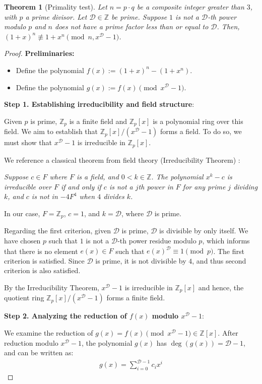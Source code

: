 \documentclass{article}
\theoremstyle{plain}
\theoremstyle{definition}
\newtheorem{theorem}{Theorem}
\newcommand{\D}{\mathcal{D}}
\begin{document}
\begin{theorem}[Primality test] \label{theorem:composites}
\textit{Let $n = p \cdot q$ be a composite integer greater than $3$, with $p$ a prime divisor. Let $\D \in \mathbb{Z}$ be prime. Suppose $1$ is not a $\D$-th power modulo $p$ and $n$ does not have a prime factor less than or equal to $\D$. Then, $(1 + x)^n \not\equiv 1 + x^n \pmod{n, x^{\D} - 1}$.}
\end{theorem}
\begin{proof}
\textbf{Preliminaries:}
\begin{itemize}
    \item Define the polynomial $f(x) := (1 + x)^n - (1 + x^n)$.
    \item Define the polynomial $g(x) := f(x) \pmod{x^{\D} - 1}$.
\end{itemize}

\textbf{Step 1. Establishing irreducibility and field structure}:

Given $p$ is prime, $\mathbb{Z}_p$ is a finite field and $\mathbb{Z}_p[x]$ is a polynomial ring over this field. We aim to establish that $\mathbb{Z}_p[x]/(x^{\D}-1)$ forms a field. To do so, we must show that $x^{\D}-1$ is irreducible in $\mathbb{Z}_p[x]$.

We reference a classical theorem from field theory (Irreducibility Theorem) \cite{karpilovsky1989fields}:

\textit{Suppose $c \in F$ where $F$ is a field, and $0 < k \in \mathbb{Z}$. The polynomial $x^k - c$ is irreducible over $F$ if and only if $c$ is not a $j$th power in $F$ for any prime $j$ dividing $k$, and $c$ is not in $-4F^4$ when $4$ divides $k$.}

In our case, $F = \mathbb{Z}_p$, $c = 1$, and $k = \D$, where $\D$ is prime.

Regarding the first criterion, given $\D$ is prime, $\D$ is divisible by only itself. We have chosen $p$ such that $1$ is not a $\D$-th power residue modulo $p$, which informs that there is no element $e(x) \in F$ such that $e(x)^{\D} \equiv 1 \pmod{p}$. The first criterion is satisfied. Since $\D$ is prime, it is not divisible by $4$, and thus second criterion is also satisfied.

By the Irreducibility Theorem, $x^{\D}-1$ is irreducible in $\mathbb{Z}_p[x]$ and hence, the quotient ring $\mathbb{Z}_p[x]/(x^{\D}-1)$ forms a finite field.

\textbf{Step 2. Analyzing the reduction of $f(x)$ modulo $x^\D - 1$}:

We examine the reduction of $g(x) = f(x) \pmod{x^{\D}-1} \in \mathbb{Z}[x]$. After reduction modulo $x^\D - 1$, the polynomial $g(x)$ has $\deg(g(x)) = \D-1$, and can be written as:
\begin{align}
    g(x) = \sum_{i=0}^{\D-1} c_i x^i
\end{align}


\end{proof}
\end{document}
